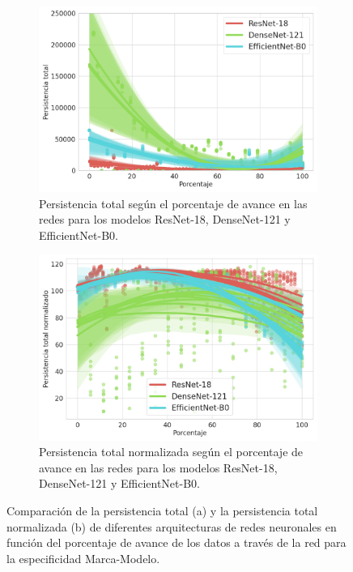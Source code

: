 \begin{figure}[H]
	\centering
	\begin{subfigure}{.5\textwidth}
		\centering
		\includegraphics[width=\linewidth]{img/mm_arch.png}
		\caption{Persistencia total según el porcentaje de avance en las redes para los modelos ResNet-18, DenseNet-121 y EfficientNet-B0.}
		\label{fig:mm-homology-arch-1}
	\end{subfigure}%
	\begin{subfigure}{.5\textwidth}
		\centering
		\includegraphics[width=\linewidth]{img/mm_arch_norm.png}
		\caption{Persistencia total normalizada según el porcentaje de avance en las redes para los modelos ResNet-18, DenseNet-121 y EfficientNet-B0.}
		\label{fig:mm-homology-arch-2}
	\end{subfigure}
	\caption{Comparación de la persistencia total (a) y la persistencia total normalizada (b) de diferentes arquitecturas de redes neuronales en función del porcentaje de avance de los datos a través de la red para la especificidad Marca-Modelo.}
	\label{fig:mm-homology-arch}
\end{figure}

